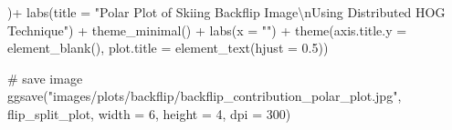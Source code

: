 \documentclass[
  letterpaper,
  DIV=11,
  numbers=noendperiod]{scrreprt}
\newenvironment{Shaded}{\begin{snugshade}}{\end{snugshade}}
\newcommand{\AttributeTok}[1]{\textcolor[rgb]{0.40,0.45,0.13}{#1}}
\newcommand{\CommentTok}[1]{\textcolor[rgb]{0.37,0.37,0.37}{#1}}
\newcommand{\DecValTok}[1]{\textcolor[rgb]{0.68,0.00,0.00}{#1}}
\newcommand{\FloatTok}[1]{\textcolor[rgb]{0.68,0.00,0.00}{#1}}
\newcommand{\FunctionTok}[1]{\textcolor[rgb]{0.28,0.35,0.67}{#1}}
\newcommand{\NormalTok}[1]{\textcolor[rgb]{0.00,0.23,0.31}{#1}}
\newcommand{\SpecialCharTok}[1]{\textcolor[rgb]{0.37,0.37,0.37}{#1}}
\newcommand{\StringTok}[1]{\textcolor[rgb]{0.13,0.47,0.30}{#1}}
\begin{document}
\begin{Shaded}
\begin{Highlighting}[]
\NormalTok{  )}\SpecialCharTok{+}
  \FunctionTok{labs}\NormalTok{(}\AttributeTok{title =} \StringTok{"Polar Plot of Skiing Backflip Image}\SpecialCharTok{\textbackslash{}n}\StringTok{Using Distributed HOG Technique"}\NormalTok{) }\SpecialCharTok{+}
  \FunctionTok{theme\_minimal}\NormalTok{() }\SpecialCharTok{+}
  \FunctionTok{labs}\NormalTok{(}\AttributeTok{x =} \StringTok{""}\NormalTok{) }\SpecialCharTok{+}
  \FunctionTok{theme}\NormalTok{(}\AttributeTok{axis.title.y =} \FunctionTok{element\_blank}\NormalTok{(),}
        \AttributeTok{plot.title =} \FunctionTok{element\_text}\NormalTok{(}\AttributeTok{hjust =} \FloatTok{0.5}\NormalTok{))}

\CommentTok{\# save image}
\FunctionTok{ggsave}\NormalTok{(}\StringTok{"images/plots/backflip/backflip\_contribution\_polar\_plot.jpg"}\NormalTok{, flip\_split\_plot, }\AttributeTok{width =} \DecValTok{6}\NormalTok{, }\AttributeTok{height =} \DecValTok{4}\NormalTok{, }\AttributeTok{dpi =} \DecValTok{300}\NormalTok{)}
\end{Highlighting}
\end{Shaded}
\end{document}
